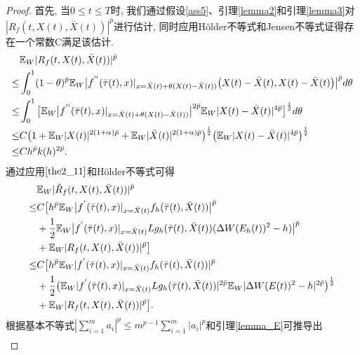  \begin{proof}
 首先, 当$0\leq t\leq T$时, 我们通过假设\ref{ass5}、引理\ref{lemma2}和引理\ref{lemma3}对$|R_{f}(t,X(t),\bar{X}(t))|^{\bar{p}}$进行估计, 同时应用H{\"o}lder不等式和Jensen不等式证得存在一个常数C满足该估计.
    \begin{align}
        \label{th317}
        &\mathbb{E}_{W}|R_{f}(t,X(t),\bar{X}(t))|^{\bar{p}}\nonumber\\
        \leq&\int^{1}_{0}(1-\theta)^{\bar{p}}\mathbb{E}_{W}\big|f^{''}(\bar{\tau}(t),x)|_{x=\bar{X}(t)+\theta(X(t)-\bar{X}(t))}\nonumber\big(X(t)-\bar{X}(t),X(t)-\bar{X}(t)\big)\big|^{\bar{p}}d\theta \nonumber\\
        \leq&\int^{1}_{0}\big[\mathbb{E}_{W}\big|f^{''}(\bar{\tau}(t),x)|_{x=\bar{X}(t)+\theta(X(t)-\bar{X}(t))}\big|^{2\bar{p}}\mathbb{E}_{W}|X(t)-\bar{X}(t)|^{4\bar{p}}\big]^{\frac{1}{2}}d\theta \nonumber\\
        \leq&C\big(1+\mathbb{E}_{W}|X(t)|^{2(1+\alpha)\bar{p}}+\mathbb{E}_{W}|\bar{X}(t)|^{2(1+\alpha)\bar{p}}\big)^{\frac{1}{2}}\big(\mathbb{E}_{W}|X(t)-\bar{X}(t)|^{4\bar{p}}\big)^{\frac{1}{2}} \nonumber\\
        \leq&Ch^{\bar{p}}k(h)^{2\bar{p}}.
    \end{align}
通过应用$\eqref{the2_11}$和H{\"o}lder不等式可得
\begin{align}
    \label{th318}
    &\mathbb{E}_{W}|\tilde{R}_{f}(t,X(t),\bar{X}(t))|^{\bar{p}}\nonumber\\
    \leq&
    C\big[h^{\bar{p}}\mathbb{E}_{W}\big|f^{'}(\bar{\tau}(t),x)|_{x=\bar{X}(t)}f_{h}(\bar{\tau}(t),\bar{X}(t))\big|^{\bar{p}}\nonumber\\
    &+\dfrac{1}{2}\mathbb{E}_{W}\big|f^{'}(\bar{\tau}(t),x)|_{x=\bar{X}(t)}Lg_{h}(\bar{\tau}(t),\bar{X}(t))(\Delta W(E_{h}(t))^{2}-h)\big|^{\bar{p}}\nonumber\\
    &+\mathbb{E}_{W}|R_{f}(t,X(t),\bar{X}(t))|^{\bar{p}}\big]\nonumber\\
    \leq&
    C\big[h^{\bar{p}}\mathbb{E}_{W}|f^{'}(\bar{\tau}(t),x)|_{x=\bar{X}(t)}f_{h}(\bar{\tau}(t),\bar{X}(t))|^{\bar{p}}\nonumber\\
    &+\dfrac{1}{2}\big(\mathbb{E}_{W}|f^{'}(\bar{\tau}(t),x)|_{x=\bar{X}(t)}Lg_{h}(\bar{\tau}(t),\bar{X}(t))|^{2\bar{p}}\nonumber\mathbb{E}_{W}|\Delta W(E(t))^{2}-h|^{2\bar{p}}\big)^{\frac{1}{2}}\\
    &+\mathbb{E}_{W}|R_{f}(t,X(t),\bar{X}(t))|^{\bar{p}}\big].
\end{align}
根据基本不等式$|\sum_{i=1}^{m}a_{i}|^{p}\leq m^{p-1}\sum_{i=1}^{m}|a_{i}|^{p}$和引理\ref{lemma_E}可推导出
\begin{align}

\end{align}
\end{proof}
